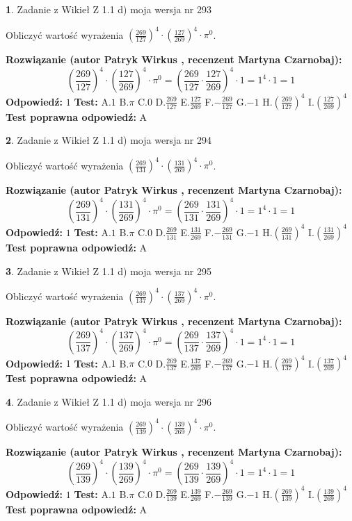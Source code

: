\documentclass[12pt, a4paper]{article}
\theoremstyle{definition} %
\newtheorem{zad}{}
\newcommand{\zadStart}[1]{\begin{zad}#1\newline}
\newcommand{\zadStop}{\end{zad}}
\newcommand{\rozwStart}[2]{\noindent \textbf{Rozwiązanie (autor #1 , recenzent #2): }\newline}
\newcommand{\rozwStop}{\newline}
\newcommand{\odpStart}{\noindent \textbf{Odpowiedź:}\newline}
\newcommand{\odpStop}{\newline}
\newcommand{\testStart}{\noindent \textbf{Test:}\newline}
\newcommand{\testStop}{\newline}
\newcommand{\kluczStart}{\noindent \textbf{Test poprawna odpowiedź:}\newline}
\newcommand{\kluczStop}{\newline}
\begin{document}
\zadStart{Zadanie z Wikieł Z 1.1 d) moja wersja nr 293}

Obliczyć wartość wyrażenia $(\frac{269}{127})^{4} \cdot (\frac{127}{269})^{4} \cdot \pi^{0}$.
\zadStop
\rozwStart{Patryk Wirkus}{Martyna Czarnobaj}
$$(\frac{269}{127})^{4} \cdot (\frac{127}{269})^{4} \cdot \pi^{0} = (\frac{269}{127} \cdot \frac{127}{269})^{4} \cdot 1 = 1^{4} \cdot 1 = 1$$
\rozwStop
\odpStart
$1$
\odpStop
\testStart
A.$1$ B.$\pi$ C.$0$ D.$\frac{269}{127}$ E.$\frac{127}{269}$
F.$-\frac{269}{127}$ G.$-1$
H.$(\frac{269}{127})^{4}$
I.$(\frac{127}{269})^{4}$
\testStop
\kluczStart
A
\kluczStop



\zadStart{Zadanie z Wikieł Z 1.1 d) moja wersja nr 294}

Obliczyć wartość wyrażenia $(\frac{269}{131})^{4} \cdot (\frac{131}{269})^{4} \cdot \pi^{0}$.
\zadStop
\rozwStart{Patryk Wirkus}{Martyna Czarnobaj}
$$(\frac{269}{131})^{4} \cdot (\frac{131}{269})^{4} \cdot \pi^{0} = (\frac{269}{131} \cdot \frac{131}{269})^{4} \cdot 1 = 1^{4} \cdot 1 = 1$$
\rozwStop
\odpStart
$1$
\odpStop
\testStart
A.$1$ B.$\pi$ C.$0$ D.$\frac{269}{131}$ E.$\frac{131}{269}$
F.$-\frac{269}{131}$ G.$-1$
H.$(\frac{269}{131})^{4}$
I.$(\frac{131}{269})^{4}$
\testStop
\kluczStart
A
\kluczStop



\zadStart{Zadanie z Wikieł Z 1.1 d) moja wersja nr 295}

Obliczyć wartość wyrażenia $(\frac{269}{137})^{4} \cdot (\frac{137}{269})^{4} \cdot \pi^{0}$.
\zadStop
\rozwStart{Patryk Wirkus}{Martyna Czarnobaj}
$$(\frac{269}{137})^{4} \cdot (\frac{137}{269})^{4} \cdot \pi^{0} = (\frac{269}{137} \cdot \frac{137}{269})^{4} \cdot 1 = 1^{4} \cdot 1 = 1$$
\rozwStop
\odpStart
$1$
\odpStop
\testStart
A.$1$ B.$\pi$ C.$0$ D.$\frac{269}{137}$ E.$\frac{137}{269}$
F.$-\frac{269}{137}$ G.$-1$
H.$(\frac{269}{137})^{4}$
I.$(\frac{137}{269})^{4}$
\testStop
\kluczStart
A
\kluczStop



\zadStart{Zadanie z Wikieł Z 1.1 d) moja wersja nr 296}

Obliczyć wartość wyrażenia $(\frac{269}{139})^{4} \cdot (\frac{139}{269})^{4} \cdot \pi^{0}$.
\zadStop
\rozwStart{Patryk Wirkus}{Martyna Czarnobaj}
$$(\frac{269}{139})^{4} \cdot (\frac{139}{269})^{4} \cdot \pi^{0} = (\frac{269}{139} \cdot \frac{139}{269})^{4} \cdot 1 = 1^{4} \cdot 1 = 1$$
\rozwStop
\odpStart
$1$
\odpStop
\testStart
A.$1$ B.$\pi$ C.$0$ D.$\frac{269}{139}$ E.$\frac{139}{269}$
F.$-\frac{269}{139}$ G.$-1$
H.$(\frac{269}{139})^{4}$
I.$(\frac{139}{269})^{4}$
\testStop
\kluczStart
A
\kluczStop
\end{document}

